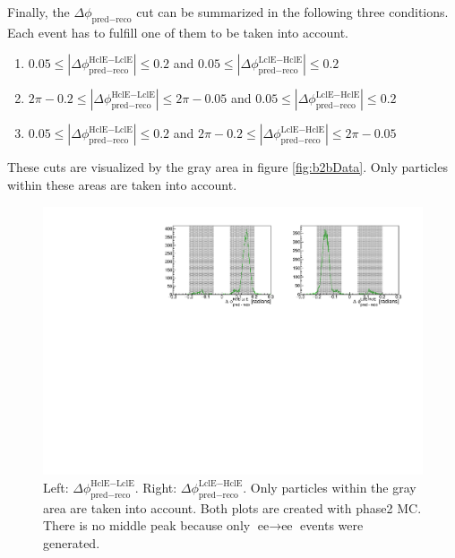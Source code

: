 \documentclass[a4paper,11pt,twosided,final,german,openbib,pdftex,listof=totoc,bibliography=totoc]{scrbook}
\begin{document}
Finally, the $\Delta \phi _{\textrm{pred} - \textrm{reco}}$ cut can be summarized in the following three conditions. Each event has to fulfill one of them to be taken into account.

\begin{enumerate}[label=(\alph*)]
	\item $0.05 \leq |\Delta \phi _{\textrm{pred} - \textrm{reco}}^{\textrm{HclE}-\textrm{LclE}}| \leq 0.2$ and $ 0.05 \leq |\Delta \phi _{\textrm{pred} - \textrm{reco}}^{\textrm{LclE}-\textrm{HclE}}| \leq 0.2$
	\item $2\pi - 0.2 \leq |\Delta \phi _{\textrm{pred} - \textrm{reco}}^{\textrm{HclE}-\textrm{LclE}}|\leq 2\pi - 0.05$ and $ 0.05 \leq |\Delta \phi _{\textrm{pred} - \textrm{reco}}^{\textrm{LclE}-\textrm{HclE}}| \leq 0.2$
	\item $0.05 \leq|\Delta \phi _{\textrm{pred} - \textrm{reco}}^{\textrm{HclE}-\textrm{LclE}}| \leq 0.2 $ and $2\pi - 0.2 \leq |\Delta \phi _{\textrm{pred} - \textrm{reco}}^{\textrm{LclE}-\textrm{HclE}}| \leq 2\pi - 0.05$
\end{enumerate}

These cuts are visualized by the gray area in figure \ref{fig:b2bData}. Only particles within these areas are taken into account.




\begin{figure}[h!]
	\centering
	\includegraphics[width=\textwidth]{Plots/master/sb2b_MC.pdf}
	\caption[b2bClusterPhi - clusterPhi For Phase2 MC]{Left: $\Delta \phi _{\textrm{pred} - \textrm{reco}}^{\textrm{HclE}-\textrm{LclE}}$. Right:  $\Delta \phi _{\textrm{pred} - \textrm{reco}}^{\textrm{LclE}-\textrm{HclE}}$. Only particles within the gray area are taken into account. Both plots are created with phase2 MC. There is no middle peak because only $\textrm{ee} \rightarrow \textrm{ee}$ events were generated.}
	\label{fig:b2bMC}
\end{figure}
\end{document}
